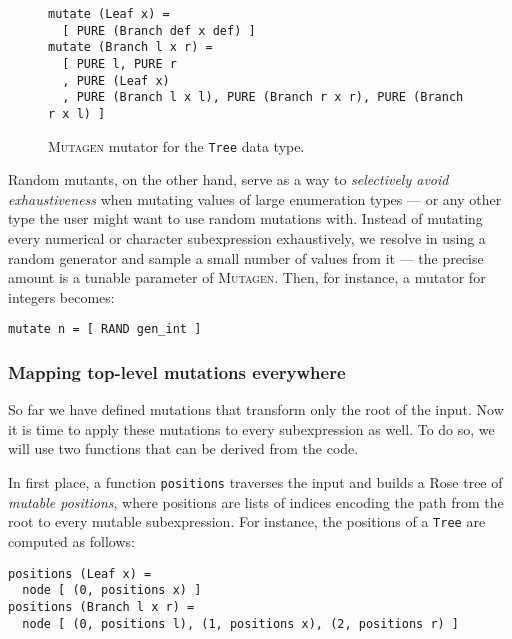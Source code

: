 \documentclass[sigconf, anonymous, review]{acmart}
\newcommand{\mutagen}{\textsc{Mutagen}\xspace}
\begin{document}
\begin{figure}[t]
\begin{verbatim}
mutate (Leaf x) =
  [ PURE (Branch def x def) ]
mutate (Branch l x r) =
  [ PURE l, PURE r
  , PURE (Leaf x)
  , PURE (Branch l x l), PURE (Branch r x r), PURE (Branch r x l) ]
\end{verbatim}
\vspace{-5pt}
\caption{\label{fig:mutagen:mutator}\mutagen mutator for the \texttt{Tree} data
  type.}
\vspace{-5pt}
\end{figure}

%
Random mutants, on the other hand, serve as a way to \emph{selectively avoid
  exhaustiveness} when mutating values of large enumeration types --- or any
other type the user might want to use random mutations with.
%
Instead of mutating every numerical or character subexpression exhaustively, we
resolve in using a random generator and sample a small number of values from it
--- the precise amount is a tunable parameter of \mutagen.
%
Then, for instance, a mutator for integers becomes:

\begin{verbatim}
mutate n = [ RAND gen_int ]
\end{verbatim}


\subsubsection{Mapping top-level mutations everywhere}

So far we have defined mutations that transform only the root of the input.
%
Now it is time to apply these mutations to every subexpression as well.
%
To do so, we will use two functions that can be derived from the code.

In first place, a function \texttt{positions} traverses the input and builds a
Rose tree of \emph{mutable positions}, where positions are lists of indices
encoding the path from the root to every mutable subexpression.
%
For instance, the positions of a \texttt{Tree} are computed as follows:

\begin{verbatim}
positions (Leaf x) =
  node [ (0, positions x) ]
positions (Branch l x r) =
  node [ (0, positions l), (1, positions x), (2, positions r) ]
\end{verbatim}
\end{document}
